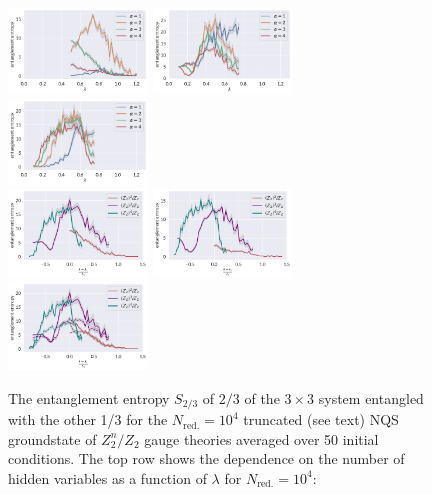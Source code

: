 	\begin{figure}[t]
		\centering
		\includegraphics[width=0.33\textwidth]{figures/chapter3/EE_Ntwo.pdf}%
			\includegraphics[width=0.33\textwidth]{figures/chapter3/EE_Nthree.pdf}%
			\includegraphics[width=0.33\textwidth]{figures/chapter3/EE_Nfour.pdf}\\
		\includegraphics[width=0.33\textwidth]{figures/chapter3/EE_all_fieldsA3.pdf}%
			\includegraphics[width=0.33\textwidth]{figures/chapter3/EE_all_fieldsA4.pdf}\\
		\includegraphics[width=0.33\textwidth]{figures/chapter3/EE_alpha_four_diffNsamples.pdf}
		\caption{The entanglement entropy $S_{2/3}$ of $2/3$ of the $3 \times 3$ system entangled with the other 1/3 for the $N_{\text{red.}}=10^4$ truncated (see text) NQS groundstate of $Z_2^n/Z_2$ gauge theories averaged over 50 initial conditions. The top row shows the dependence on the number of hidden variables as a function of $\lambda$ for $N_{\text{red.}}=10^4$: 
}
\end{figure}
